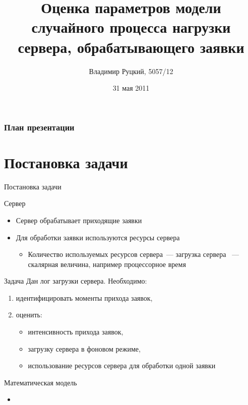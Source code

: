 \documentclass[utf8]{beamer}
\title[Оценка параметров случайного процесса]{Оценка параметров модели случайного процесса нагрузки сервера, обрабатывающего заявки}
\author{Владимир Руцкий, 5057/12}
\institute[СПбГПУ]{Санкт-Петербургский государственный политехнический университет}
\date{31 мая 2011}
\begin{document}
\begin{frame}
\titlepage
\end{frame}


\begin{frame}
\frametitle{План презентации}
\tableofcontents
\end{frame}


\section{Постановка задачи}
\begin{frame}{Постановка задачи}
\begin{block}{Сервер}
  \begin{itemize}
    \item Сервер обрабатывает приходящие заявки
    \item Для обработки заявки используются ресурсы сервера
      \begin{itemize}
        \item Количество используемых ресурсов сервера~--- загрузка сервера ~--- скалярная величина, например процессорное время
      \end{itemize}
  \end{itemize}
\end{block}

\begin{block}{Задача}
  Дан лог загрузки сервера. 
  Необходимо:
  \begin{enumerate}
    \item идентифицировать моменты прихода заявок,
    \item оценить:
      \begin{itemize}
        \item интенсивность прихода заявок,
        \item загрузку сервера в фоновом режиме,
        \item использование ресурсов сервера для обработки одной заявки
      \end{itemize}
  \end{enumerate}
\end{block}
\end{frame}

\begin{frame}{Математическая модель}
\begin{itemize}
  \item 
\end{itemize}
\end{frame}
\end{document}
